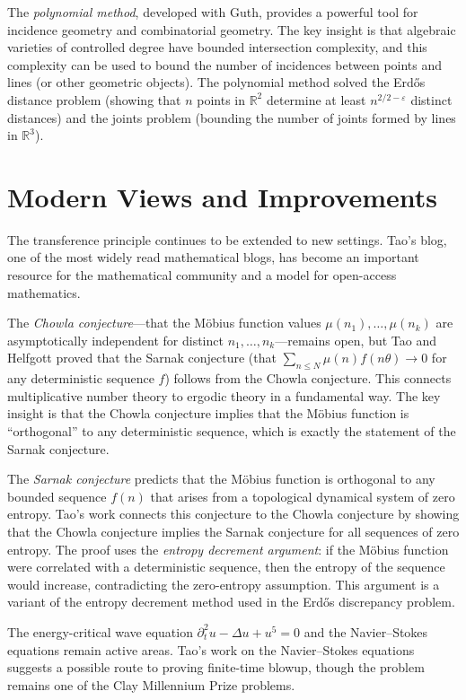 The \emph{polynomial method}, developed with Guth, provides a powerful tool for incidence geometry and combinatorial geometry. The key insight is that algebraic varieties of controlled degree have bounded intersection complexity, and this complexity can be used to bound the number of incidences between points and lines (or other geometric objects). The polynomial method solved the Erd\H{o}s distance problem (showing that $n$ points in $\mathbb{R}^2$ determine at least $n^{2/2-\varepsilon}$ distinct distances) and the joints problem (bounding the number of joints formed by lines in $\mathbb{R}^3$).

\section{Modern Views and Improvements}

The transference principle continues to be extended to new settings. Tao's blog, one of the most widely read mathematical blogs, has become an important resource for the mathematical community and a model for open-access mathematics.

The \emph{Chowla conjecture}---that the M\"obius function values $\mu(n_1), \ldots, \mu(n_k)$ are asymptotically independent for distinct $n_1, \ldots, n_k$---remains open, but Tao and Helfgott proved that the Sarnak conjecture (that $\sum_{n \le N} \mu(n) f(n \theta) \to 0$ for any deterministic sequence $f$) follows from the Chowla conjecture. This connects multiplicative number theory to ergodic theory in a fundamental way. The key insight is that the Chowla conjecture implies that the M\"obius function is ``orthogonal'' to any deterministic sequence, which is exactly the statement of the Sarnak conjecture.

The \emph{Sarnak conjecture} predicts that the M\"obius function is orthogonal to any bounded sequence $f(n)$ that arises from a topological dynamical system of zero entropy. Tao's work connects this conjecture to the Chowla conjecture by showing that the Chowla conjecture implies the Sarnak conjecture for all sequences of zero entropy. The proof uses the \emph{entropy decrement argument}: if the M\"obius function were correlated with a deterministic sequence, then the entropy of the sequence would increase, contradicting the zero-entropy assumption. This argument is a variant of the entropy decrement method used in the Erd\H{o}s discrepancy problem.

The energy-critical wave equation $\partial_t^2 u - \Delta u + u^5 = 0$ and the Navier--Stokes equations remain active areas. Tao's work on the Navier--Stokes equations suggests a possible route to proving finite-time blowup, though the problem remains one of the Clay Millennium Prize problems.

